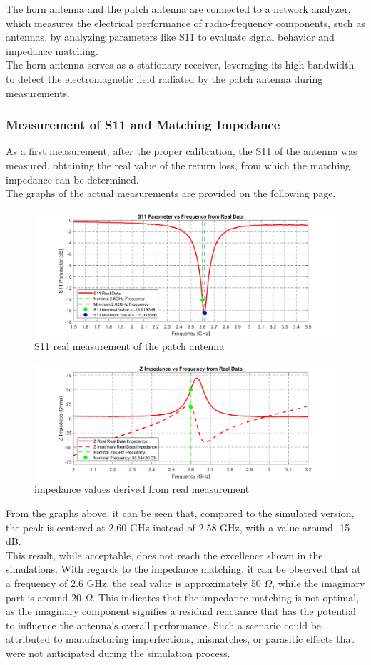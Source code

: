 \documentclass[]{article}
\begin{document}
The horn antenna and the patch antenna are connected to a network analyzer, which measures the electrical performance of radio-frequency components, such as antennas, by analyzing parameters like S11 to evaluate signal behavior and impedance matching.\\
The horn antenna serves as a stationary receiver, leveraging its high bandwidth to detect the electromagnetic field radiated by the patch antenna during measurements.\\
\subsubsection{Measurement of S11 and Matching Impedance}
As a first measurement, after the proper calibration, the S11 of the antenna was measured, obtaining the real value of the return loss, from which the matching impedance can be determined.\\
The graphs of the actual measurements are provided on the following page.\\
\begin{figure}[H]
	\centering
	\includegraphics[width=0.7\linewidth]{img/S11_vs_freq_real_cropped}
	\caption{S11 real measurement of the patch antenna}
	\label{fig:s11vsfreqrealcropped}
\end{figure}

\begin{figure}[h]
	\centering
	\includegraphics[width=0.7\linewidth]{img/Z_vs_freq_real_data_cropped}
	\caption{impedance values derived from real measurement }
	\label{fig:zvsfreqrealdatacropped}
\end{figure}

From the graphs above, it can be seen that, compared to the simulated version, the peak is centered at 2.60 GHz instead of 2.58 GHz, with a value around -15 dB.\\
This result, while acceptable, does not reach the excellence shown in the simulations. With regards to the impedance matching, it can be observed that at a frequency of 2.6 GHz, the real value is approximately 50 $\Omega$, while the imaginary part is around 20 $\Omega$. This indicates that the impedance matching is not optimal, as the imaginary component signifies a residual reactance that has the potential to influence the antenna's overall performance. Such a scenario could be attributed to manufacturing imperfections, mismatches, or parasitic effects that were not anticipated during the simulation process. 
\end{document}

